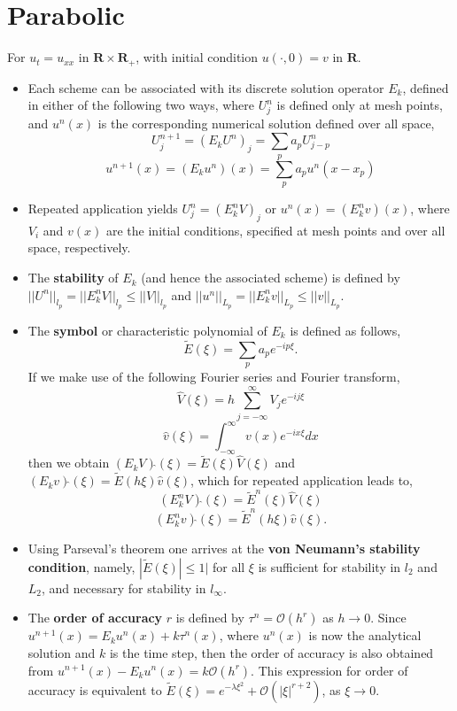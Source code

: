 \documentclass[oneside,a4paper,11pt]{report}
\begin{document}
\chapter{Parabolic}
For $u_t = u_{xx}$ in $\mathbf{R}\times\mathbf{R_+}$, with initial condition $u(\cdot,0) = v$ in $\mathbf{R}$.
\begin{itemize}
\item Each scheme can be associated with its discrete solution operator $E_k$, defined in either of the following two ways, where $U^n_{j}$ is defined only at mesh points, and $u^n(x)$ is the corresponding numerical solution defined over all space,
$$U_j^{n+1} = (E_kU^n)_j = \sum_p a_pU_{j-p}^n$$
$$u^{n+1}(x) = (E_ku^n)(x) = \sum_p a_pu^n(x-x_p)$$

\item Repeated application yields $U^n_j = (E_k^nV)_j$ or $u^n(x) = (E_k^nv)(x)$, where $V_i$ and $v(x)$ are the initial conditions, specified at mesh points and over all space, respectively.

\item The \textbf{stability} of $E_k$ (and hence the associated scheme) is defined by $||U^n||_{l_p} = ||E_k^nV||_{l_p} \le ||V||_{l_p}$ and $||u^n||_{L_p} = ||E_k^nv||_{L_p} \le ||v||_{L_p}$. 

\item The \textbf{symbol} or characteristic polynomial of $E_k$ is defined as follows,
$$\tilde{E}(\xi) = \sum_p a_pe^{-i p \xi}.$$
If we make use of the following Fourier series and Fourier transform,
$$\hat{V}(\xi) = h \sum_{j=-\infty}^{\infty}V_j e^{-ij\xi}$$
$$\hat{v}(\xi) = \int_{-\infty}^{\infty}v(x)e^{-ix\xi}dx$$
then we obtain $(E_kV)\hat{}(\xi) = \tilde{E}(\xi)\hat{V}(\xi)$ and $(E_kv)\hat{}(\xi) = \tilde{E}(h\xi)\hat{v}(\xi)$, which for repeated application leads to,
$$(E^n_kV)\hat{}(\xi) = \tilde{E}^n(\xi)\hat{V}(\xi)$$
$$(E^n_kv)\hat{}(\xi) = \tilde{E}^n(h\xi)\hat{v}(\xi).$$

\item Using Parseval's theorem one arrives at the \textbf{von Neumann's stability condition}, namely, $|\tilde{E}(\xi)| \le 1|$ for all $\xi$ is sufficient for stability in $l_2$ and $L_2$, and necessary for stability in $l_\infty$.
 
\item The \textbf{order of accuracy} $r$ is defined by $\tau^n = \mathcal{O}(h^r)$ as $h \to 0$. Since $u^{n+1}(x) = E_ku^n(x) + k\tau^n(x)$, where $u^n(x)$ is now the analytical solution and $k$ is the time step, then the order of accuracy is also obtained from $u^{n+1}(x) - E_ku^n(x) = k\mathcal{O}(h^r)$. This expression for order of accuracy is equivalent to $\tilde{E}(\xi) = e^{-\lambda \xi^2} + \mathcal{O}(|\xi|^{r+2})$, as $\xi \to 0$.
\end{itemize}
\end{document}
